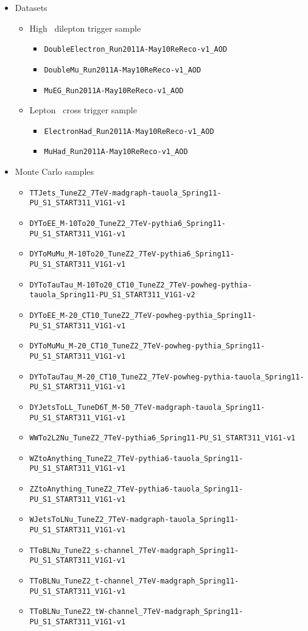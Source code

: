 \begin{itemize}
   \item Datasets
   \begin{itemize}
      \item High \pt\ dilepton trigger sample
      \begin{itemize}
         \item \verb=DoubleElectron_Run2011A-May10ReReco-v1_AOD=
         \item \verb=DoubleMu_Run2011A-May10ReReco-v1_AOD=
         \item \verb=MuEG_Run2011A-May10ReReco-v1_AOD=
      \end{itemize}
      \item Lepton \Ht\ cross trigger sample
      \begin{itemize}
         \item \verb=ElectronHad_Run2011A-May10ReReco-v1_AOD=
         \item \verb=MuHad_Run2011A-May10ReReco-v1_AOD=
      \end{itemize}
   \end{itemize}

\item Monte Carlo samples
\begin{itemize} 
\item \verb=TTJets_TuneZ2_7TeV-madgraph-tauola_Spring11-PU_S1_START311_V1G1-v1=
\item \verb=DYToEE_M-10To20_TuneZ2_7TeV-pythia6_Spring11-PU_S1_START311_V1G1-v1=
\item \verb=DYToMuMu_M-10To20_TuneZ2_7TeV-pythia6_Spring11-PU_S1_START311_V1G1-v1=
\item \verb=DYToTauTau_M-10To20_CT10_TuneZ2_7TeV-powheg-pythia-tauola_Spring11-PU_S1_START311_V1G1-v2=
\item \verb=DYToEE_M-20_CT10_TuneZ2_7TeV-powheg-pythia_Spring11-PU_S1_START311_V1G1-v1=
\item \verb=DYToMuMu_M-20_CT10_TuneZ2_7TeV-powheg-pythia_Spring11-PU_S1_START311_V1G1-v1=
\item \verb=DYToTauTau_M-20_CT10_TuneZ2_7TeV-powheg-pythia-tauola_Spring11-PU_S1_START311_V1G1-v1=
\item \verb=DYJetsToLL_TuneD6T_M-50_7TeV-madgraph-tauola_Spring11-PU_S1_START311_V1G1-v1=
\item \verb=WWTo2L2Nu_TuneZ2_7TeV-pythia6_Spring11-PU_S1_START311_V1G1-v1=
\item \verb=WZtoAnything_TuneZ2_7TeV-pythia6-tauola_Spring11-PU_S1_START311_V1G1-v1=
\item \verb=ZZtoAnything_TuneZ2_7TeV-pythia6-tauola_Spring11-PU_S1_START311_V1G1-v1=
\item \verb=WJetsToLNu_TuneZ2_7TeV-madgraph-tauola_Spring11-PU_S1_START311_V1G1-v1=
\item \verb=TToBLNu_TuneZ2_s-channel_7TeV-madgraph_Spring11-PU_S1_START311_V1G1-v1=
\item \verb=TToBLNu_TuneZ2_t-channel_7TeV-madgraph_Spring11-PU_S1_START311_V1G1-v1=
\item \verb=TToBLNu_TuneZ2_tW-channel_7TeV-madgraph_Spring11-PU_S1_START311_V1G1-v1=
\end{itemize}
\end{itemize}



